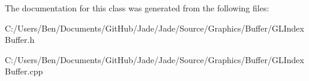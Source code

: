 The documentation for this class was generated from the following files\+:\begin{DoxyCompactItemize}
\item 
C\+:/\+Users/\+Ben/\+Documents/\+Git\+Hub/\+Jade/\+Jade/\+Source/\+Graphics/\+Buffer/G\+L\+Index\+Buffer.\+h\item 
C\+:/\+Users/\+Ben/\+Documents/\+Git\+Hub/\+Jade/\+Jade/\+Source/\+Graphics/\+Buffer/G\+L\+Index\+Buffer.\+cpp\end{DoxyCompactItemize}
